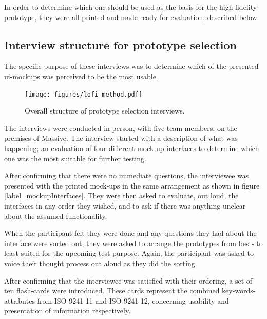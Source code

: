 {  In order to determine which one should be used as the
  basis for the high-fidelity prototype, they were all printed and made ready
  for evaluation, described below.

  \subsection{Interview structure for prototype selection}


    The specific purpose of these interviews was to determine which of the
    presented ui-mockups was perceived to be the most usable.

    \begin{figure}[h!]
      \centering
      \texttt{[image: figures/lofi\_method.pdf]}
      \caption{Overall structure of prototype selection interviews.}
    \end{figure}

    The interviews were conducted in-person, with five team members, on
    the premises of Massive. The interview started with a description of
    what was happening; an evaluation of four different mock-up interfaces
    to determine which one was the most suitable for further testing.

    After confirming that there were no immediate questions, the
    interviewee was presented with the printed mock-ups in the same
    arrangement as shown in figure \ref{label_mockupInterfaces}. They were
    then asked to evaluate, out loud, the interfaces in any order they
    wished, and to ask if there was anything unclear about the assumed
    functionality.

    When the participant felt they were done and any questions they had
    about the interface were sorted out, they were asked to arrange the
    prototypes from best- to least-suited for the upcoming test purpose.
    Again, the participant was asked to voice their thought process out
    aloud as they did the sorting.

    After confirming that the interviewee was satisfied with their ordering, a
    set of ten flash-cards were introduced. These cards represent the combined
    key-words-attributes from ISO 9241-11\cite{citeISO9241} and ISO
    9241-12\cite{citeISO9241-12}, concerning usability and presentation of
    information respectively.

}

